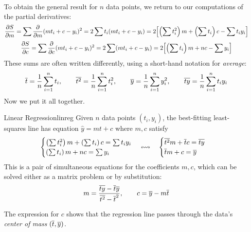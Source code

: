 \goodbreak

To obtain the general result for $n$ data points, we return to our computations of the partial derivatives:
\begin{gather*}
\partials[S]{m}=\sum\partials{m}(mt_i+c-y_i)^2 =2\sum t_i(mt_i+c-y_i) =2\Bigl[\left(\sum t_i^2\right)m+\left(\sum t_i\right)c-\sum t_iy_i\Bigr]\\[3pt]
\partials[S]{c}=\sum\partials{c}(mt_i+c-y_i)^2 =2\sum (mt_i+c-y_i) =2\Bigl[\left(\sum t_i\right)m+nc-\sum y_i\Bigr]
\end{gather*}
These sums are often written differently, using a short-hand notation for \emph{average}:
\[\cl t=\frac 1n\sum_{i=1}^nt_i,\qquad \cl{t^2}=\frac 1n\sum_{i=1}^nt_i^2,\qquad \cl{y}=\frac 1n\sum_{i=1}^ny_i^2,\qquad \cl{ty}=\frac 1n\sum_{i=1}^nt_iy_i\]
Now we put it all together.

\begin{thm}{Linear Regression}{linreg}
Given $n$ data points $(t_i,y_i)$, the best-fitting least-squares line has equation $\hat y=mt+c$ where $m,c$ satisfy
\[\begin{cases}
\left(\sum t_i^2\right)m+\left(\sum t_i\right)c=\sum t_iy_i\\
\left(\sum t_i\right)m+nc=\sum y_i
\end{cases} \leftrightsquigarrow \quad\begin{cases}
\cl{t^2}m+\cl tc=\cl{ty}\\
\cl tm+c=\cl y\\
\end{cases}\]
This is a pair of simultaneous equations for the coefficients $m,c$, which can be solved either as a matrix problem or by substitution:
\[m=\frac{\cl{ty}-\cl t \cl y}{\cl{t^2}-\cl t^2},\qquad c=\cl y-m\cl t %
\]
\end{thm}

The expression for $c$ shows that the regression line passes through the data's \emph{center of mass} $(\cl t,\cl y)$.



